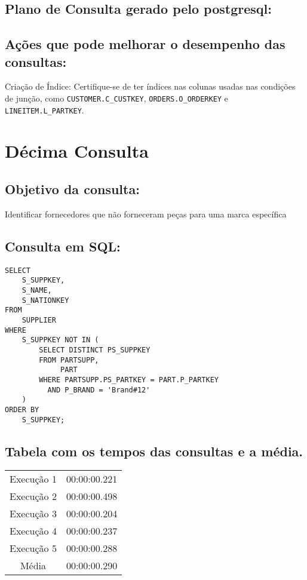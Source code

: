 \documentclass[12pt]{article}
\begin{document}
\begin{landscape}
\subsection{Plano de Consulta gerado pelo postgresql:}

\subsection{Ações que pode melhorar o desempenho das 
consultas:} Criação de Índice: Certifique-se de ter índices nas colunas usadas nas condições de junção, como \texttt{CUSTOMER.C\_CUSTKEY}, \texttt{ORDERS.O\_ORDERKEY} e \texttt{LINEITEM.L\_PARTKEY}.

\section{Décima Consulta}


\subsection{Objetivo da consulta:}
Identificar fornecedores que não forneceram peças para uma marca específica

\subsection{Consulta em SQL:}
\begin{lstlisting}
SELECT
    S_SUPPKEY,
    S_NAME,
    S_NATIONKEY
FROM
    SUPPLIER
WHERE
    S_SUPPKEY NOT IN (
        SELECT DISTINCT PS_SUPPKEY
        FROM PARTSUPP,
             PART
        WHERE PARTSUPP.PS_PARTKEY = PART.P_PARTKEY
          AND P_BRAND = 'Brand#12'
    )
ORDER BY
    S_SUPPKEY;
\end{lstlisting}

\subsection{Tabela com os tempos das consultas e a média.}
\begin{tabular}{|c|c|}
  \hline
  Execução 1 & 00:00:00.221 \\
  Execução 2 & 00:00:00.498 \\
  Execução 3 & 00:00:00.204 \\
  Execução 4 & 00:00:00.237 \\
  Execução 5 & 00:00:00.288 \\
  \hline
  Média & 00:00:00.290 \\
  \hline
\end{tabular}


\end{landscape}
\end{document}
